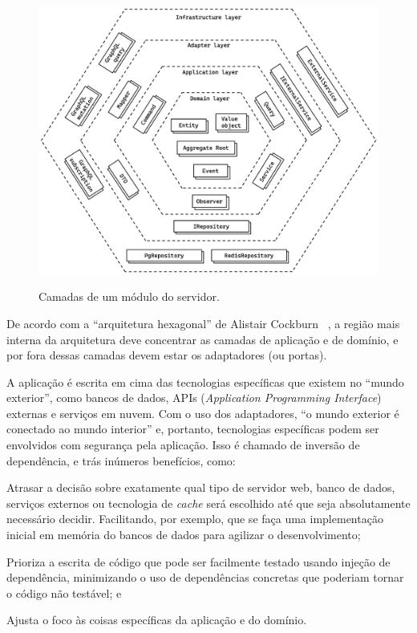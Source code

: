 \begin{figure}[htbp]
	\caption{\small Camadas de um módulo do servidor.}
	\centering
	\includegraphics[width=\textwidth]{../diagrams/out/system_server_each-module_layers.png}
	\label{f.system_server_each-module_layers}
\end{figure}

\FloatBarrier

De acordo com a ``arquitetura hexagonal'' de Alistair Cockburn ~\cite{hexagonal-architecture}, a região mais interna da arquitetura deve concentrar as camadas de aplicação e de domínio, e por fora dessas camadas devem estar os adaptadores (ou portas). 

A aplicação é escrita em cima das tecnologias específicas que existem no ``mundo exterior'', como bancos de dados, APIs (\emph{Application Programming Interface}) externas e serviços em nuvem. Com o uso dos adaptadores, ``o mundo exterior é conectado ao mundo interior'' e, portanto, tecnologias específicas podem ser envolvidos com segurança pela aplicação. Isso é chamado de inversão de dependência, e trás inúmeros benefícios, como: 

\begin{alineas}
	\item Atrasar a decisão sobre exatamente qual tipo de servidor web, banco de dados, serviços externos ou tecnologia de \emph{cache} será escolhido até que seja absolutamente necessário decidir. Facilitando, por exemplo, que se faça uma implementação inicial em memória do bancos de dados para agilizar o desenvolvimento;
	\item Prioriza a escrita de código que pode ser facilmente testado usando injeção de dependência, minimizando o uso de dependências concretas que poderiam tornar o código não testável; e
	\item Ajusta o foco às coisas específicas da aplicação e do domínio.
\end{alineas}


